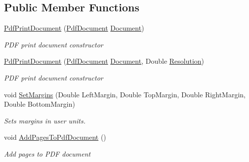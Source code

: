 \subsection*{Public Member Functions}
\begin{DoxyCompactItemize}
\item 
\hyperlink{class_pdf_file_writer_1_1_pdf_print_document_a21a54826dabb01f4678a4b68d05eea2a}{Pdf\+Print\+Document} (\hyperlink{class_pdf_file_writer_1_1_pdf_document}{Pdf\+Document} \hyperlink{class_pdf_file_writer_1_1_pdf_print_document_aedc2e1a562b0933d302df93071aa4bc8}{Document})
\begin{DoxyCompactList}\small\item\em P\+DF print document constructor \end{DoxyCompactList}\item 
\hyperlink{class_pdf_file_writer_1_1_pdf_print_document_a2861d898fa797ad2a578a135f2a7cd0f}{Pdf\+Print\+Document} (\hyperlink{class_pdf_file_writer_1_1_pdf_document}{Pdf\+Document} \hyperlink{class_pdf_file_writer_1_1_pdf_print_document_aedc2e1a562b0933d302df93071aa4bc8}{Document}, Double \hyperlink{class_pdf_file_writer_1_1_pdf_print_document_a6597d5ffcf16bdcac7f7551b0c1be9b3}{Resolution})
\begin{DoxyCompactList}\small\item\em P\+DF print document constructor \end{DoxyCompactList}\item 
void \hyperlink{class_pdf_file_writer_1_1_pdf_print_document_a40d189a7e85ea9e1c25cbf5090554052}{Set\+Margins} (Double Left\+Margin, Double Top\+Margin, Double Right\+Margin, Double Bottom\+Margin)
\begin{DoxyCompactList}\small\item\em Sets margins in user units. \end{DoxyCompactList}\item 
void \hyperlink{class_pdf_file_writer_1_1_pdf_print_document_a360e6ebf5e8e210a904145467b9f9cc7}{Add\+Pages\+To\+Pdf\+Document} ()
\begin{DoxyCompactList}\small\item\em Add pages to P\+DF document \end{DoxyCompactList}\end{DoxyCompactItemize}
